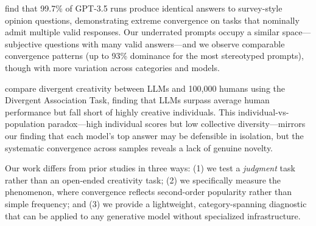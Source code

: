 \citet{pmc2024diminished} find that 99.7\% of GPT-3.5 runs produce identical answers to survey-style opinion questions, demonstrating extreme convergence on tasks that nominally admit multiple valid responses. Our underrated prompts occupy a similar space---subjective questions with many valid answers---and we observe comparable convergence patterns (up to 93\% dominance for the most stereotyped prompts), though with more variation across categories and models.

\citet{divergent2024creativity} compare divergent creativity between LLMs and 100,000 humans using the Divergent Association Task, finding that LLMs surpass average human performance but fall short of highly creative individuals. This individual-vs-population paradox---high individual scores but low collective diversity---mirrors our finding that each model's top answer may be defensible in isolation, but the systematic convergence across samples reveals a lack of genuine novelty.

Our work differs from prior studies in three ways: (1) we test a \emph{judgment} task rather than an open-ended creativity task; (2) we specifically measure the \metapop phenomenon, where convergence reflects second-order popularity rather than simple frequency; and (3) we provide a lightweight, category-spanning diagnostic that can be applied to any generative model without specialized infrastructure.
